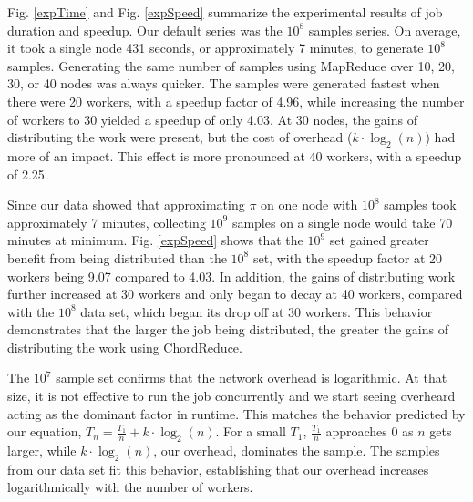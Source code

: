 \documentclass[10pt, conference, compsocconf]{IEEEtran}
\begin{document}
Fig. \ref{expTime} and Fig. \ref{expSpeed} summarize the experimental results of job duration and speedup.  Our default series was the $10^{8}$ samples series.  On average, it took a single node 431 seconds, or approximately 7 minutes, to generate $10^{8}$ samples.  Generating the same number of samples using MapReduce over 10, 20, 30, or 40 nodes was always quicker.  The samples were generated fastest when there were 20 workers, with a speedup factor of 4.96, while increasing the number of workers to 30 yielded a speedup of only 4.03.  At 30 nodes, the gains of distributing the work were present, but the cost of overhead ($k \cdot \log_{2}(n)$) had more of an impact.  This effect is more pronounced at 40 workers, with a speedup of 2.25.

Since our data showed that approximating $\pi$ on one node with $10^{8}$ samples took approximately 7 minutes, collecting $10^{9}$ samples on a single node would take 70 minutes at minimum.  Fig. \ref{expSpeed} shows that the $10^{9}$ set gained greater benefit from being distributed than the $10^{8}$ set, with the speedup factor at 20 workers being 9.07 compared to 4.03.  In addition, the gains of distributing work further increased at 30 workers and only began to decay at 40 workers, compared with the $10^{8}$ data set, which began its drop off at 30 workers. This behavior demonstrates that the larger the job being distributed, the greater the gains of distributing the work using ChordReduce.

The $10^{7}$ sample set confirms that the network overhead is logarithmic.  At that size, it is not effective to run the job concurrently and we start seeing overheard acting as the dominant factor in runtime.  This matches the behavior predicted by our equation, $T_{n} = \frac{T_{1}}{n} + k \cdot \log_{2}(n)$. For a small $T_{1}$, $\frac{T_{1}}{n}$  approaches 0 as $n$ gets larger, while $k \cdot \log_{2}(n)$, our overhead, dominates the sample.  The samples from our data set fit this behavior, establishing that our overhead increases logarithmically with the number of workers.
\end{document}

